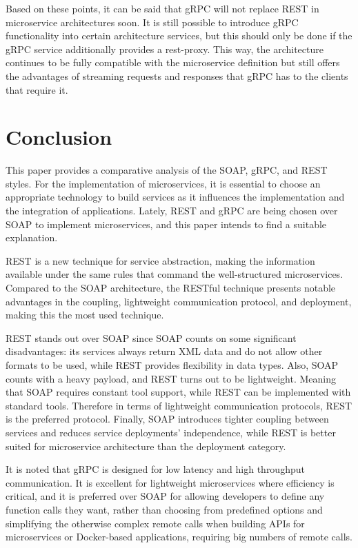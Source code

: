 \documentclass[conference]{IEEEtran}
\begin{document}
Based on these points, it can be said that gRPC will not replace REST in microservice architectures soon. It is still possible to introduce gRPC functionality into certain architecture services, but this should only be done if the gRPC service additionally provides a rest-proxy. This way, the architecture continues to be fully compatible with the microservice definition but still offers the advantages of streaming requests and responses that gRPC has to the clients that require it.

\section{Conclusion}

This paper provides a comparative analysis of the SOAP, gRPC, and REST styles. For the implementation of microservices, it is essential to choose an appropriate technology to build services as it influences the implementation and the integration of applications. Lately, REST and gRPC are being chosen over SOAP to implement microservices, and this paper intends to find a suitable explanation. 

REST is a new technique for service abstraction, making the information available under the same rules that command the well-structured microservices. Compared to the SOAP architecture, the RESTful technique presents notable advantages in the coupling, lightweight communication protocol, and deployment, making this the most used technique. 

REST stands out over SOAP since SOAP counts on some significant disadvantages: its services always return XML data and do not allow other formats to be used, while REST provides flexibility in data types. Also, SOAP counts with a heavy payload, and REST turns out to be lightweight. Meaning that SOAP requires constant tool support, while REST can be implemented with standard tools. Therefore in terms of lightweight communication protocols, REST is the preferred protocol. Finally, SOAP introduces tighter coupling between services and reduces service deployments' independence, while REST is better suited for microservice architecture than the deployment category.

It is noted that gRPC is designed for low latency and high throughput communication. It is excellent for lightweight microservices where efficiency is critical, and it is preferred over SOAP for allowing developers to define any function calls they want, rather than choosing from predefined options and simplifying the otherwise complex remote calls when building APIs for microservices or Docker-based applications, requiring big numbers of remote calls.
\end{document}
